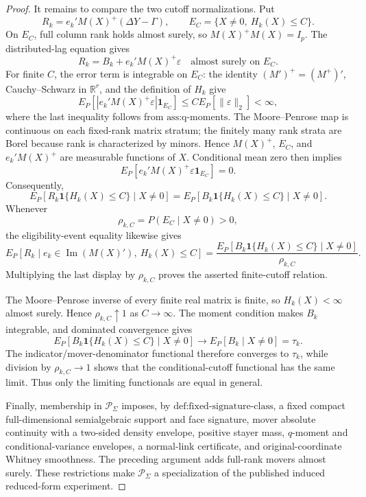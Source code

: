 \documentclass{article}
\begin{document}
\begin{proof}
It remains to compare the two cutoff normalizations. Put
\[
R_k=e_k'M(X)^+(\Delta Y-\Gamma),
\qquad
E_C=\{X\ne0,\ H_k(X)\le C\}.
\]
On \(E_C\), full column rank holds almost surely, so \(M(X)^+M(X)=I_p\). The distributed-lag equation gives
\[
R_k=B_k+e_k'M(X)^+\varepsilon
\quad\text{almost surely on }E_C.
\]
For finite \(C\), the error term is integrable on \(E_C\): the identity \((M')^+=(M^+)'\), Cauchy--Schwarz in \(\mathbb R^r\), and the definition of \(H_k\) give
\[
E_P\!\left[|e_k'M(X)^+\varepsilon|\mathbf 1_{E_C}\right]
\le C E_P[\lVert\varepsilon\rVert_2]<\infty,
\]
where the last inequality follows from \(\text{ass:q-moments}\). The Moore--Penrose map is continuous on each fixed-rank matrix stratum; the finitely many rank strata are Borel because rank is characterized by minors. Hence \(M(X)^+\), \(E_C\), and \(e_k'M(X)^+\) are measurable functions of \(X\). Conditional mean zero then implies
\[
E_P[e_k'M(X)^+\varepsilon\mathbf 1_{E_C}]=0.
\]
Consequently,
\[
E_P[R_k\mathbf 1\{H_k(X)\le C\}\mid X\ne0]
=E_P[B_k\mathbf 1\{H_k(X)\le C\}\mid X\ne0].
\]
Whenever
\[
\rho_{k,C}=P(E_C\mid X\ne0)>0,
\]
the eligibility-event equality likewise gives
\[
E_P[R_k\mid e_k\in\operatorname{Im}(M(X)'),\ H_k(X)\le C]
=\frac{E_P[B_k\mathbf 1\{H_k(X)\le C\}\mid X\ne0]}{\rho_{k,C}}.
\]
Multiplying the last display by \(\rho_{k,C}\) proves the asserted finite-cutoff relation.

The Moore--Penrose inverse of every finite real matrix is finite, so \(H_k(X)<\infty\) almost surely. Hence \(\rho_{k,C}\uparrow1\) as \(C\to\infty\). The moment condition makes \(B_k\) integrable, and dominated convergence gives
\[
E_P[B_k\mathbf 1\{H_k(X)\le C\}\mid X\ne0]
\longrightarrow E_P[B_k\mid X\ne0]=\tau_k.
\]
The indicator/mover-denominator functional therefore converges to \(\tau_k\), while division by \(\rho_{k,C}\to1\) shows that the conditional-cutoff functional has the same limit. Thus only the limiting functionals are equal in general.

Finally, membership in \(\mathcal P_\Sigma\) imposes, by \(\text{def:fixed-signature-class}\), a fixed compact full-dimensional semialgebraic support and face signature, mover absolute continuity with a two-sided density envelope, positive stayer mass, \(q\)-moment and conditional-variance envelopes, a normal-link certificate, and original-coordinate Whitney smoothness. The preceding argument adds full-rank movers almost surely. These restrictions make \(\mathcal P_\Sigma\) a specialization of the published induced reduced-form experiment.


\end{proof}
\end{document}
